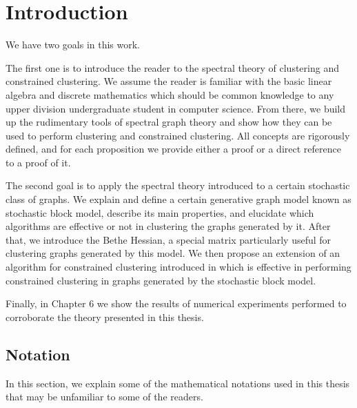 \setcounter{page}{0}
\tableofcontents
\listoffigures
\listoftables

\pagebreak \setcounter{page}{1}


\chapter{Introduction}
We have two goals in this work.

The first one is to introduce the reader to the spectral theory of clustering and constrained clustering.
We assume the reader is familiar with the basic linear algebra and discrete mathematics which should be common knowledge to any upper division undergraduate student in computer science.
From there, we build up the rudimentary tools of spectral graph theory and show how they can be used to perform clustering and constrained clustering.
All concepts are rigorously defined, and for each proposition we provide either a proof or a direct reference to a proof of it.

The second goal is to apply the spectral theory introduced to a certain stochastic class of graphs. We explain and define a certain generative graph model known as stochastic block model, describe its main properties, and elucidate which algorithms are effective or not in clustering the graphs generated by it.
After that, we introduce the Bethe Hessian, a special matrix particularly useful for clustering graphs generated by this model.
We then propose an extension of an algorithm for constrained clustering introduced in \cite{fastge2} which is effective in performing constrained clustering in graphs generated by the stochastic block model.

Finally, in Chapter 6 we show the results of numerical experiments performed to corroborate the theory presented in this thesis.

\section{Notation}
In this section, we explain some of the mathematical notations used in this thesis that may be unfamiliar to some of the readers.


